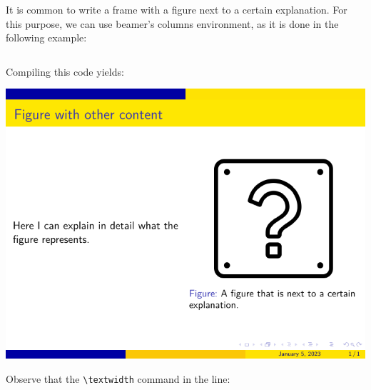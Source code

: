 It is common to write a frame with a figure next to a certain explanation. For this purpose, we can use beamer’s columns environment, as it is done in the following example:

\inputminted[linenos=true]{latex}{examples/beamer/figure-next-to-text.tex}

Compiling this code yields:

\includegraphics{examples/beamer/figure-next-to-text.pdf}

Observe that the \verb|\textwidth| command in the line:

